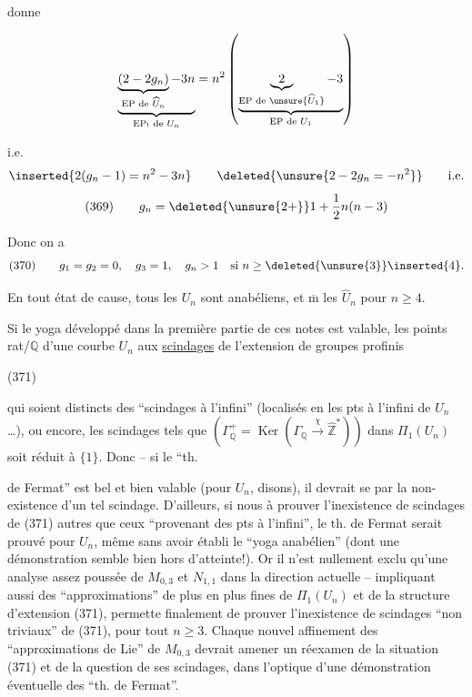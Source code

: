 
donne

\[
\underbrace{\underbrace{(2-2g_n)}_{\text{EP de }\widehat U_n}-3n}_{\text{EP}_{!}\text{ de }U_n}
=n^2\left(\underbrace{\underbrace{2}_{\text{EP de }\unsure{\widehat U_1}}-3}_{\text{EP de }U_1}\right)
\]

i.e.
\[
\inserted{2(g_n-1)=n^2-3n}
\qquad
\deleted{\unsure{2-2g_n=-n^2}}
\qquad \text{i.e.}
\]
\[
\text{(369)}\qquad g_n=\deleted{\unsure{2+}}1+\frac12 n(n-3)
\]

Donc on a
\[
\text{(370)}\qquad g_1=g_2=0,\quad g_3=1,\quad g_n>1\quad\text{si }n\geq\deleted{\unsure{3}}\inserted{4}.
\]

En tout état de cause, tous les $U_n$ sont anabéliens, et $\overline{\mathrm m}$ les $\widehat U_n$ pour $n\geq4$.

Si le yoga  développé dans la première partie de ces notes est valable, les   points rat/$\mathbb Q$ d'une courbe $U_n$   aux \uline{scindages} de l'extension de groupes profinis

\noindent (371)

qui soient distincts des ``scindages à l'infini'' (localisés en les  pts à l'infini de $U_n$\ldots), ou encore, les scindages tels que  $(\Gamma_{\mathbb Q}^{+}=\operatorname{Ker}(\Gamma_{\mathbb Q}\xrightarrow{\chi}\widehat{\mathbb Z}^{*}))$ dans $\Pi_1(U_n)$ soit réduit à $\{1\}$. Donc -- si le ``th.


de Fermat'' est bel et bien valable (pour $U_n$, disons), il devrait se  par la non-existence d'un tel scindage. D'ailleurs, si nous  à prouver l'inexistence de scindages de (371) autres que ceux ``provenant des pts à l'infini'', le th. de Fermat serait prouvé pour $U_n$, même sans avoir établi le ``yoga anabélien'' (dont une démonstration semble bien hors d'atteinte!). Or il n'est nullement exclu qu'une analyse assez poussée de $M_{0,3}$ et $N_{1,1}$ dans la direction actuelle -- impliquant aussi des ``approximations'' de plus en plus fines de $\Pi_1(U_n)$ et de la structure d'extension (371), permette finalement de prouver l'inexistence de scindages ``non triviaux'' de (371), pour tout $n\geq3$. Chaque nouvel affinement des ``approximations de Lie'' de $M_{0,3}$ devrait amener un réexamen de la situation (371) et de la question de ses scindages, dans l'optique d'une démonstration éventuelle des ``th. de Fermat''.

